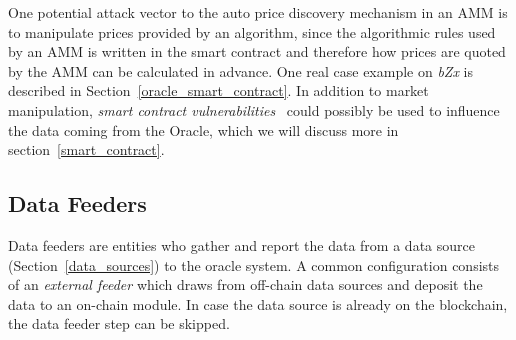 
One potential attack vector to the auto price discovery mechanism in an AMM is to manipulate prices provided by an algorithm, since the algorithmic rules used by an AMM is written in the smart contract and therefore how prices are quoted by the AMM can be calculated in advance. One real case example on \textit{bZx} is described in Section~\ref{oracle_smart_contract}. In addition to market manipulation, \textit{smart contract vulnerabilities}~\cite{atzei2017survey,chen2020survey} could possibly be used to influence the data coming from the Oracle, which we will discuss more in section~\ref{smart_contract}.





\subsection{Data Feeders}\label{data_feeders} 

Data feeders are entities who gather and report the data from a data source (Section~\ref{data_sources}) to the oracle system. 
A common configuration consists of an \textit{external feeder} which draws from off-chain data sources and deposit the data to an on-chain module. In case the data source is already on the blockchain, the data feeder step can be skipped.

